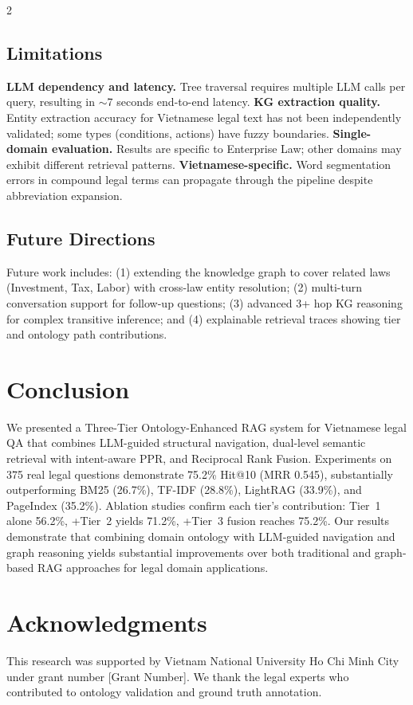 \documentclass[11pt,a4paper]{article}
\begin{document}
\begin{multicols}{2}
\subsection{Limitations}

\textbf{LLM dependency and latency.} Tree traversal requires multiple LLM calls per query, resulting in $\sim$7 seconds end-to-end latency.
\textbf{KG extraction quality.} Entity extraction accuracy for Vietnamese legal text has not been independently validated; some types (conditions, actions) have fuzzy boundaries.
\textbf{Single-domain evaluation.} Results are specific to Enterprise Law; other domains may exhibit different retrieval patterns.
\textbf{Vietnamese-specific.} Word segmentation errors in compound legal terms can propagate through the pipeline despite abbreviation expansion.

\subsection{Future Directions}

Future work includes: (1) extending the knowledge graph to cover related laws (Investment, Tax, Labor) with cross-law entity resolution; (2) multi-turn conversation support for follow-up questions; (3) advanced 3+ hop KG reasoning for complex transitive inference; and (4) explainable retrieval traces showing tier and ontology path contributions.

\section{Conclusion}
\label{sec:conclusion}

We presented a Three-Tier Ontology-Enhanced RAG system for Vietnamese legal QA that combines LLM-guided structural navigation, dual-level semantic retrieval with intent-aware PPR, and Reciprocal Rank Fusion. Experiments on 375 real legal questions demonstrate 75.2\% Hit@10 (MRR 0.545), substantially outperforming BM25 (26.7\%), TF-IDF (28.8\%), LightRAG (33.9\%), and PageIndex (35.2\%). Ablation studies confirm each tier's contribution: Tier~1 alone 56.2\%, +Tier~2 yields 71.2\%, +Tier~3 fusion reaches 75.2\%. Our results demonstrate that combining domain ontology with LLM-guided navigation and graph reasoning yields substantial improvements over both traditional and graph-based RAG approaches for legal domain applications.

\section*{Acknowledgments}

This research was supported by Vietnam National University Ho Chi Minh City under grant number [Grant Number]. We thank the legal experts who contributed to ontology validation and ground truth annotation.

\end{multicols}
\end{document}
